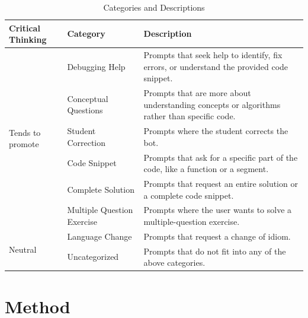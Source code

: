 \documentclass[conference]{IEEEtran}
\begin{document}
\begin{table}[htbp]
\caption{Categories and Descriptions}
    \begin{center}
    \begin{tabular}{|p{3cm}|p{3cm}|p{5cm}|}
    \hline
    \textbf{Critical Thinking} & \textbf{Category} & \textbf{Description} \\
    \hline
    \multirow{6}{3cm}{Tends to promote} & Debugging Help & Prompts that seek
    help to identify, fix errors, or understand the provided code snippet. \\
    & Conceptual Questions & Prompts that are more about understanding concepts
    or algorithms rather than specific code. \\
    & Student Correction & Prompts where the student corrects the bot. \\
    \hline
    \multirow{6}{3cm}{Tends not to promote} & Code Snippet & Prompts that ask
    for a specific part of the code, like a function or a segment. \\
    & Complete Solution & Prompts that request an entire solution or a complete
    code snippet. \\
    & Multiple Question Exercise & Prompts where the user wants to solve a
    multiple-question exercise. \\
    \hline
    \multirow{3}{3cm}{Neutral} & Language Change & Prompts that request a change
    of idiom. \\
    & Uncategorized & Prompts that do not fit into any of the above categories. \\
    \hline
    \end{tabular}
    \label{tab:categories}
    \end{center}
\end{table}

\section{Method}
\end{document}
